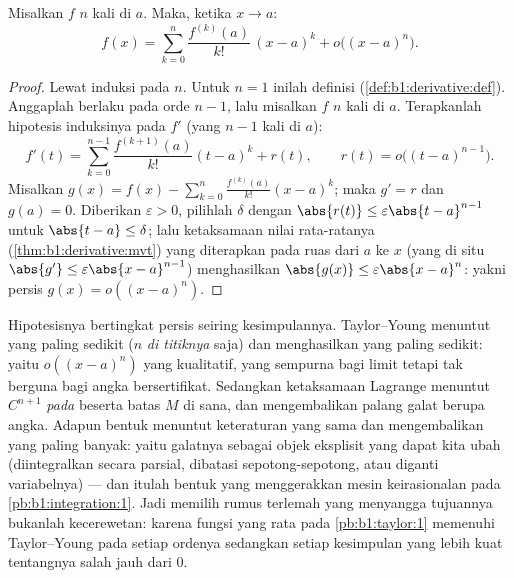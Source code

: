 \begin{theorem}\label{thm:b1:taylor:young}
Misalkan $f$  $n$ kali di $a$. Maka, ketika $x \to a$:
\[
f(x) = \sum_{k=0}^{n} \frac{f^{(k)}(a)}{k!}\,(x-a)^k
+ o\bigl((x-a)^n\bigr) .
\]
\end{theorem}

\begin{proof}
Lewat induksi pada $n$. Untuk $n = 1$ inilah definisi
 (\cref{def:b1:derivative:def}). Anggaplah  berlaku pada
orde $n - 1$, lalu misalkan $f$  $n$ kali di $a$. Terapkanlah
hipotesis induksinya pada $f'$ (yang  $n-1$ kali
di $a$):
\[
f'(t) = \sum_{k=0}^{n-1} \frac{f^{(k+1)}(a)}{k!}(t-a)^k + r(t),
\qquad r(t) = o\bigl((t-a)^{n-1}\bigr).
\]
Misalkan $g(x) = f(x) - \sum_{k=0}^{n} \frac{f^{(k)}(a)}{k!}(x-a)^k$; maka
$g' = r$ dan $g(a) = 0$. Diberikan $\varepsilon > 0$, pilihlah $\delta$
dengan $\abs{r(t)} \leq \varepsilon\abs{t - a}^{n-1}$ untuk $\abs{t-a}
\leq \delta$; lalu ketaksamaan nilai rata-ratanya
(\cref{thm:b1:derivative:mvt}) yang diterapkan pada ruas dari $a$ ke
$x$ (yang di situ $\abs{g'} \leq \varepsilon\abs{x-a}^{n-1}$) menghasilkan
$\abs{g(x)} \leq \varepsilon\abs{x - a}^n$: yakni persis $g(x) =
o((x-a)^n)$.
\end{proof}

\begin{remark}
Hipotesisnya bertingkat persis seiring kesimpulannya.
Taylor--Young menuntut yang paling sedikit ($n$  \emph{di
titiknya} saja) dan menghasilkan yang paling sedikit: yaitu $o((x-a)^n)$ yang kualitatif,
yang sempurna bagi limit tetapi tak berguna bagi angka bersertifikat. Sedangkan ketaksamaan
Lagrange menuntut $C^{n+1}$ \emph{pada } beserta batas
$M$ di sana, dan mengembalikan palang galat berupa angka. Adapun bentuk 
menuntut keteraturan yang sama dan mengembalikan yang paling banyak: yaitu galatnya sebagai
objek eksplisit yang dapat kita ubah (diintegralkan secara parsial, dibatasi
sepotong-sepotong, atau diganti variabelnya) --- dan itulah bentuk yang menggerakkan
mesin keirasionalan pada \cref{pb:b1:integration:1}. Jadi memilih
rumus terlemah yang menyangga tujuannya bukanlah kecerewetan: karena
fungsi yang rata pada \cref{pb:b1:taylor:1} memenuhi Taylor--Young
pada setiap ordenya sedangkan setiap kesimpulan yang lebih kuat tentangnya
salah jauh dari $0$.
\end{remark}

